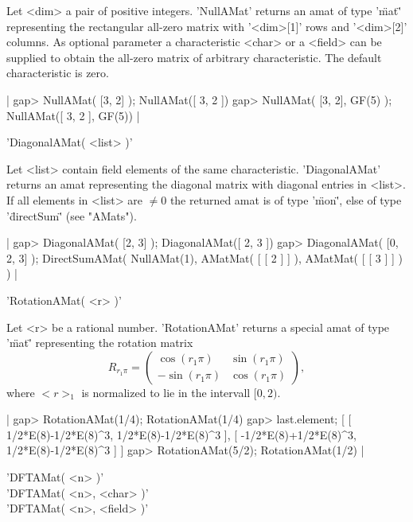 Let <dim> a pair of positive integers. 'NullAMat' returns
an amat of type '\"mat\"' representing the rectangular
all-zero matrix with '<dim>[1]' rows and '<dim>[2]' columns. 
As optional parameter a characteristic <char> or a <field> 
can be supplied to obtain the all-zero matrix of arbitrary characteristic. 
The default characteristic is zero. 

|    gap> NullAMat( [3, 2] );
    NullAMat([ 3, 2 ])
    gap> NullAMat( [3, 2], GF(5) ); 
    NullAMat([ 3, 2 ], GF(5)) |


'DiagonalAMat( <list> )'

Let <list> contain field elements of the same characteristic.
'DiagonalAMat' returns an amat representing the diagonal matrix
with diagonal entries in <list>. If all elements in <list> are
$\neq 0$ the returned amat is of type '\"mon\"', else of type
'\"directSum\"' (see "AMats").

|    gap> DiagonalAMat( [2, 3] );
    DiagonalAMat([ 2, 3 ])
    gap> DiagonalAMat( [0, 2, 3] );
    DirectSumAMat(
      NullAMat(1),
      AMatMat(
        [ [ 2 ] ]
      ),
      AMatMat(
        [ [ 3 ] ]
      )
    ) |


'RotationAMat( <r> )'

Let <r> be a rational number.
'RotationAMat' returns a special amat of type '\"mat\"' representing the 
rotation matrix 
$$
R_{r_1\pi} = \left(
\begin{array}{rr}
\cos(r_1\pi) & \sin(r_1\pi)\\
-\sin(r_1\pi) &\cos(r_1\pi)
\end{array}
\right),
$$
where $<r>_1$ is normalized to lie in the intervall $[0,2)$.

|    gap> RotationAMat(1/4);
    RotationAMat(1/4)
    gap> last.element;
    [ [ 1/2*E(8)-1/2*E(8)^3, 1/2*E(8)-1/2*E(8)^3 ], 
      [ -1/2*E(8)+1/2*E(8)^3, 1/2*E(8)-1/2*E(8)^3 ] ] 
    gap> RotationAMat(5/2);
    RotationAMat(1/2) |


'DFTAMat( <n> )'\\
'DFTAMat( <n>, <char> )'\\
'DFTAMat( <n>, <field> )'

